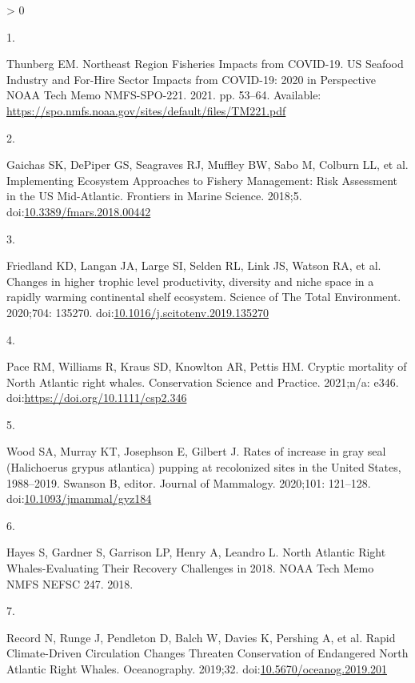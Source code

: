 \documentclass[
  10pt,
]{article}
\newlength{\cslhangindent}
\newlength{\csllabelwidth}
\newenvironment{CSLReferences}[2] %
 {%
  \setlength{\parindent}{0pt}
  \ifodd #1 \everypar{\setlength{\hangindent}{\cslhangindent}}\ignorespaces\fi
  \ifnum #2 > 0
  \setlength{\parskip}{#2\baselineskip}
  \fi
 }%
 {}
\newcommand{\CSLLeftMargin}[1]{\parbox[t]{\csllabelwidth}{#1}}
\newcommand{\CSLRightInline}[1]{\parbox[t]{\linewidth - \csllabelwidth}{#1}\break}
\begin{document}
\hypertarget{refs}{}
\begin{CSLReferences}{0}{0}
\leavevmode\hypertarget{ref-thunberg_northeast_2021}{}%
\CSLLeftMargin{1. }
\CSLRightInline{Thunberg EM. Northeast {Region} {Fisheries} {Impacts}
from {COVID}-19. U{S} {Seafood} {Industry} and {For}-{Hire} {Sector}
{Impacts} from {COVID}-19: 2020 in {Perspective} {NOAA} {Tech} {Memo}
{NMFS}-{SPO}-221. 2021. pp. 53--64. Available:
\url{https://spo.nmfs.noaa.gov/sites/default/files/TM221.pdf}}

\leavevmode\hypertarget{ref-gaichas_implementing_2018}{}%
\CSLLeftMargin{2. }
\CSLRightInline{Gaichas SK, DePiper GS, Seagraves RJ, Muffley BW, Sabo
M, Colburn LL, et al. Implementing {Ecosystem} {Approaches} to {Fishery}
{Management}: {Risk} {Assessment} in the {US} {Mid}-{Atlantic}.
Frontiers in Marine Science. 2018;5.
doi:\href{https://doi.org/10.3389/fmars.2018.00442}{10.3389/fmars.2018.00442}}

\leavevmode\hypertarget{ref-friedland_changes_2020}{}%
\CSLLeftMargin{3. }
\CSLRightInline{Friedland KD, Langan JA, Large SI, Selden RL, Link JS,
Watson RA, et al. Changes in higher trophic level productivity,
diversity and niche space in a rapidly warming continental shelf
ecosystem. Science of The Total Environment. 2020;704: 135270.
doi:\href{https://doi.org/10.1016/j.scitotenv.2019.135270}{10.1016/j.scitotenv.2019.135270}}

\leavevmode\hypertarget{ref-pace_cryptic_2021}{}%
\CSLLeftMargin{4. }
\CSLRightInline{Pace RM, Williams R, Kraus SD, Knowlton AR, Pettis HM.
Cryptic mortality of {North} {Atlantic} right whales. Conservation
Science and Practice. 2021;n/a: e346.
doi:\url{https://doi.org/10.1111/csp2.346}}

\leavevmode\hypertarget{ref-wood_rates_2020}{}%
\CSLLeftMargin{5. }
\CSLRightInline{Wood SA, Murray KT, Josephson E, Gilbert J. Rates of
increase in gray seal ({Halichoerus} grypus atlantica) pupping at
recolonized sites in the {United} {States}, 1988--2019. Swanson B,
editor. Journal of Mammalogy. 2020;101: 121--128.
doi:\href{https://doi.org/10.1093/jmammal/gyz184}{10.1093/jmammal/gyz184}}

\leavevmode\hypertarget{ref-hayes_north_2018}{}%
\CSLLeftMargin{6. }
\CSLRightInline{Hayes S, Gardner S, Garrison LP, Henry A, Leandro L.
North {Atlantic} {Right} {Whales}-{Evaluating} {Their} {Recovery}
{Challenges} in 2018. {NOAA} {Tech} {Memo} {NMFS} {NEFSC} 247. 2018. }

\leavevmode\hypertarget{ref-record_rapid_2019}{}%
\CSLLeftMargin{7. }
\CSLRightInline{Record N, Runge J, Pendleton D, Balch W, Davies K,
Pershing A, et al. Rapid {Climate}-{Driven} {Circulation} {Changes}
{Threaten} {Conservation} of {Endangered} {North} {Atlantic} {Right}
{Whales}. Oceanography. 2019;32.
doi:\href{https://doi.org/10.5670/oceanog.2019.201}{10.5670/oceanog.2019.201}}


\end{CSLReferences}
\end{document}
